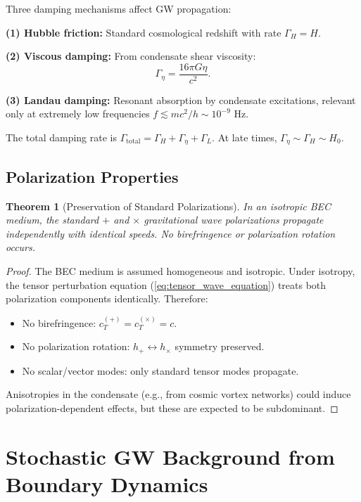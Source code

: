 \documentclass[11pt,a4paper]{article}
\newtheorem{theorem}{Theorem}[section]
\theoremstyle{definition}
\theoremstyle{remark}
\begin{document}
Three damping mechanisms affect GW propagation:

\textbf{(1) Hubble friction:} Standard cosmological redshift with rate $\Gamma_H = H$.

\textbf{(2) Viscous damping:} From condensate shear viscosity:
\begin{equation}
\Gamma_\eta = \frac{16\pi G\eta}{c^2}.
\end{equation}

\textbf{(3) Landau damping:} Resonant absorption by condensate excitations, relevant only at extremely low frequencies $f \lesssim mc^2/h \sim 10^{-9}$ Hz.

The total damping rate is $\Gamma_{\mathrm{total}} = \Gamma_H + \Gamma_\eta + \Gamma_L$. At late times, $\Gamma_\eta \sim \Gamma_H \sim H_0$.

\subsection{Polarization Properties}
\label{sec:polarization}

\begin{theorem}[Preservation of Standard Polarizations]
\label{thm:polarization}
In an isotropic BEC medium, the standard $+$ and $\times$ gravitational wave polarizations propagate independently with identical speeds. No birefringence or polarization rotation occurs.
\end{theorem}

\begin{proof}
The BEC medium is assumed homogeneous and isotropic. Under isotropy, the tensor perturbation equation (\ref{eq:tensor_wave_equation}) treats both polarization components identically. Therefore:
\begin{itemize}
\item No birefringence: $c_T^{(+)} = c_T^{(\times)} = c$.
\item No polarization rotation: $h_+ \leftrightarrow h_\times$ symmetry preserved.
\item No scalar/vector modes: only standard tensor modes propagate.
\end{itemize}

Anisotropies in the condensate (e.g., from cosmic vortex networks) could induce polarization-dependent effects, but these are expected to be subdominant.
\end{proof}

\section{Stochastic GW Background from Boundary Dynamics}
\label{sec:stochastic}
\end{document}
